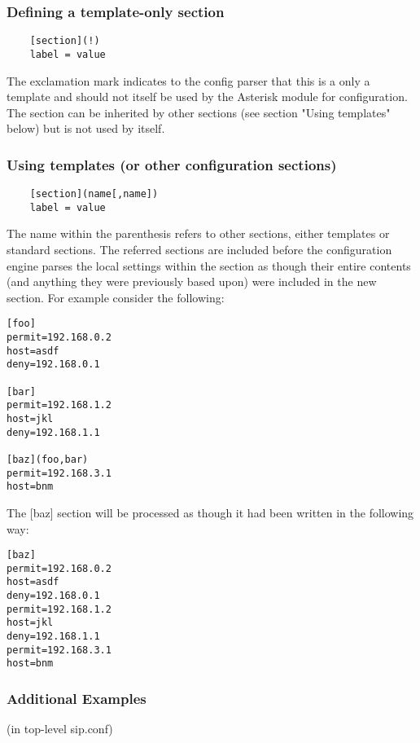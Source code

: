 \subsubsection{Defining a template-only section}
\begin{verbatim}
	[section](!)
	label = value
\end{verbatim}

The exclamation mark indicates to the config parser that this is a only
a template and should not itself be used by the Asterisk module for
configuration. The section can be inherited by other sections (see 
section "Using templates" below) but is not used by itself.

\subsubsection{Using templates (or other configuration sections)}
\begin{verbatim}
	[section](name[,name])
	label = value
\end{verbatim}

The name within the parenthesis refers to other sections, either
templates or standard sections. The referred sections are included
before the configuration engine parses the local settings within the
section as though their entire contents (and anything they were 
previously based upon) were included in the new section.  For example 
consider the following:

\begin{verbatim}
[foo]
permit=192.168.0.2
host=asdf
deny=192.168.0.1

[bar]
permit=192.168.1.2
host=jkl
deny=192.168.1.1

[baz](foo,bar)
permit=192.168.3.1
host=bnm
\end{verbatim}

The [baz] section will be processed as though it had been written in the 
following way:

\begin{verbatim}
[baz]
permit=192.168.0.2
host=asdf
deny=192.168.0.1
permit=192.168.1.2
host=jkl
deny=192.168.1.1
permit=192.168.3.1
host=bnm
\end{verbatim}

\subsubsection{Additional Examples}

(in top-level sip.conf)

